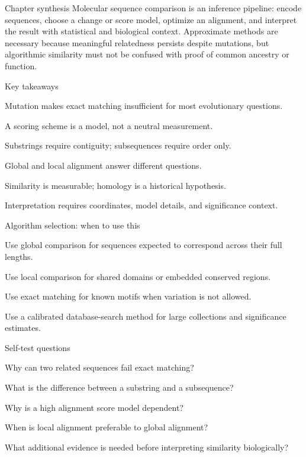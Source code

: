 \documentclass[11pt,letterpaper]{article}
\begin{document}
\begin{CornellSummaryBox}{Chapter synthesis}
Molecular sequence comparison is an inference pipeline: encode sequences, choose a change or score model, optimize an alignment, and interpret the result with statistical and biological context. Approximate methods are necessary because meaningful relatedness persists despite mutations, but algorithmic similarity must not be confused with proof of common ancestry or function.
\end{CornellSummaryBox}

\begin{CornellSummaryBox}{Key takeaways}
\begin{CornellRecallList}
  \item Mutation makes exact matching insufficient for most evolutionary questions.
  \item A scoring scheme is a model, not a neutral measurement.
  \item Substrings require contiguity; subsequences require order only.
  \item Global and local alignment answer different questions.
  \item Similarity is measurable; homology is a historical hypothesis.
  \item Interpretation requires coordinates, model details, and significance context.
\end{CornellRecallList}
\end{CornellSummaryBox}

\begin{CornellOverviewBox}{Algorithm selection: when to use this}
\begin{CornellChecklist}
  \item Use global comparison for sequences expected to correspond across their full lengths.
  \item Use local comparison for shared domains or embedded conserved regions.
  \item Use exact matching for known motifs when variation is not allowed.
  \item Use a calibrated database-search method for large collections and significance estimates.
\end{CornellChecklist}
\end{CornellOverviewBox}

\begin{CornellExamBox}{Self-test questions}
\begin{CornellRecallList}
  \item Why can two related sequences fail exact matching?
  \item What is the difference between a substring and a subsequence?
  \item Why is a high alignment score model dependent?
  \item When is local alignment preferable to global alignment?
  \item What additional evidence is needed before interpreting similarity biologically?
\end{CornellRecallList}
\end{CornellExamBox}
\end{document}
